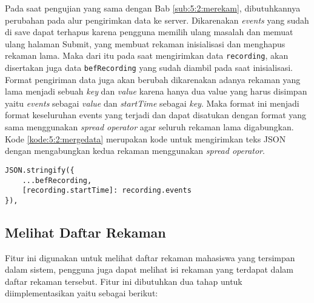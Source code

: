 Pada saat pengujian yang sama dengan Bab \ref{sub:5:2:merekam}, dibutuhkannya perubahan pada alur pengirimkan data ke server. Dikarenakan \textit{events} yang sudah di save dapat terhapus karena pengguna memilih ulang masalah dan memuat ulang halaman Submit, yang membuat rekaman inisialisasi dan menghapus rekaman lama. Maka dari itu pada saat mengirimkan data \verb|recording|, akan disertakan juga data \verb|befRecording| yang sudah diambil pada saat inisialisasi. Format pengiriman data juga akan berubah dikarenakan adanya rekaman yang lama menjadi sebuah \textit{key} dan \textit{value} karena hanya dua value yang harus disimpan yaitu \textit{events} sebagai \textit{value} dan \textit{startTime} sebagai \textit{key}. Maka format ini menjadi format keseluruhan events yang terjadi dan dapat disatukan dengan format yang sama menggunakan \textit{spread operator} agar seluruh rekaman lama digabungkan. Kode \ref{kode:5:2:mergedata} merupakan kode untuk mengirimkan teks JSON dengan mengabungkan kedua rekaman menggunakan \textit{spread operator}.

\begin{lstlisting}[caption={\textit{object callback function}}, label={kode:5:2:mergedata}]
JSON.stringify({
    ...befRecording,
    [recording.startTime]: recording.events
}),
\end{lstlisting}

\subsection{Melihat Daftar Rekaman}

Fitur ini digunakan untuk melihat daftar rekaman mahasiswa yang tersimpan dalam sistem, pengguna juga dapat melihat isi rekaman yang terdapat dalam daftar rekaman tersebut. Fitur ini dibutuhkan dua tahap untuk diimplementasikan yaitu sebagai berikut:

